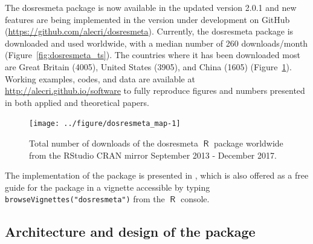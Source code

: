 \documentclass[11pt,a4paper,twoside,openany]{book}\usepackage{knitr}
\newcommand{\pkg}[1]{{\fontseries{b}\selectfont #1}}
\DeclareMathOperator{\R}{\textsf{R}}
\begin{document}
{{\begin{knitrout}
\end{knitrout}

\noindent The \pkg{dosresmeta} package is now available in the updated version 2.0.1 and new features are being implemented in the version under development on GitHub (\url{https://github.com/alecri/dosresmeta}). Currently, the \pkg{dosresmeta} package is downloaded and used worldwide, with a median number of 260 downloads/month (Figure~\ref{fig:dosresmeta_ts}). The countries where it has been downloaded most are Great Britain (4005), United States (3905), and China (1605) (Figure~\ref{fig:dosresmeta_map}). Working examples, codes, and data are available at \url{http://alecri.github.io/software} to fully reproduce figures and numbers presented in both applied and theoretical papers.

\begin{knitrout}\footnotesize
{}\color{fgcolor}\begin{figure}[ht!]

{\centering \texttt{[image: ../figure/dosresmeta\_map-1]} 

}

\caption[Total number of downloads of the \pkg{dosresmeta} $\R$ package worldwide from the RStudio CRAN mirror September 2013 - December 2017]{Total number of downloads of the \pkg{dosresmeta} $\R$ package worldwide from the RStudio CRAN mirror September 2013 - December 2017.}\label{fig:dosresmeta_map}
\end{figure}


\end{knitrout}

\noindent The implementation of the package is presented in , which is also offered as a free guide for the package in a vignette accessible by typing \texttt{browseVignettes("dosresmeta")} from the $\R$ console.

\subsection{Architecture and design of the package}

}}
\end{document}
